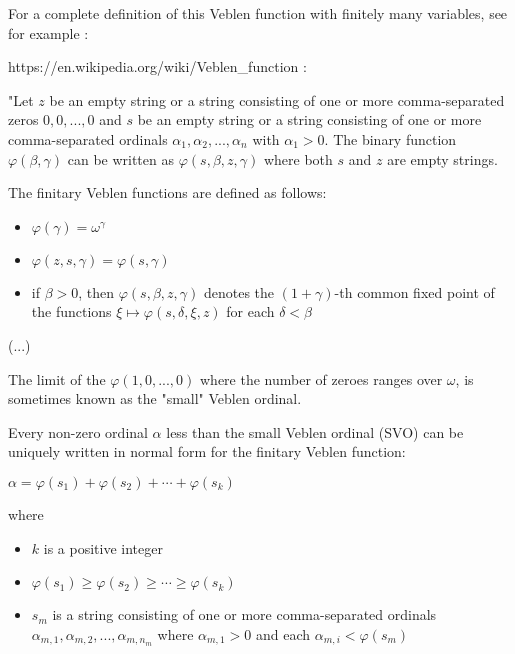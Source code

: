 \documentclass[10pt]{article}
\begin{document}
\bigskip

For a complete definition of this Veblen function with finitely many variables, see for example :

https://en.wikipedia.org/wiki/Veblen\_function :

"Let \(z\) be an empty string or a string consisting of one or more comma-separated zeros \(0,0,...,0\) and \(s\) be an empty string or a string consisting of one or more comma-separated ordinals \(\alpha _{1},\alpha _{2},...,\alpha _{n}\) with \(\alpha _{1}>0\). The binary function \(\varphi (\beta ,\gamma )\) can be written as \(\varphi (s,\beta ,z,\gamma )\) where both \(s\) and \(z\) are empty strings.

The finitary Veblen functions are defined as follows:

\begin{itemize}
     \setlength{\itemsep}{1pt}
     \setlength{\parskip}{0pt}
     \setlength{\parsep}{0pt}

\item \(\varphi (\gamma )=\omega ^{\gamma }\)
\item \(\varphi (z,s,\gamma )=\varphi (s,\gamma )\)
\item if \(\beta >0\), then \(\varphi (s,\beta ,z,\gamma )\) denotes the \((1+\gamma )\)-th common fixed point of the functions \(\xi \mapsto \varphi (s,\delta ,\xi ,z)\) for each \(\delta <\beta\)

\end{itemize}

(...)

The limit of the \(\varphi(1,0,...,0)\) where the number of zeroes ranges over \( \omega \), is sometimes known as the "small" Veblen ordinal.

Every non-zero ordinal \(\alpha\) less than the small Veblen ordinal (SVO) can be uniquely written in normal form for the finitary Veblen function:

\(\alpha =\varphi (s_{1})+\varphi (s_{2})+\cdots +\varphi (s_{k})\)

where

\begin{itemize}
     \setlength{\itemsep}{1pt}
     \setlength{\parskip}{0pt}
     \setlength{\parsep}{0pt}

\item \(k\) is a positive integer
\item \(\varphi (s_{1})\geq \varphi (s_{2})\geq \cdots \geq \varphi (s_{k})\)
\item \(s_{m}\) is a string consisting of one or more comma-separated ordinals \(\alpha _{m,1},\alpha _{m,2},...,\alpha _{m,n_{m}}\) where \(\alpha _{m,1}>0\) and each \(\alpha _{m,i}<\varphi (s_{m})\)

\end{itemize} 
\end{document}
